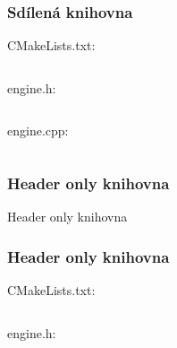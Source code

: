 \begin{frame}[fragile]
\frametitle{Sdílená knihovna}
CMakeLists.txt:
{\scriptsize\inputminted[frame=lines]{cmake}{../examples/06-SharedLibrary/CMakeLists.txt}}
engine.h:
{\scriptsize\inputminted[frame=lines]{c++}{../examples/06-SharedLibrary/engine.h}}
engine.cpp:
{\scriptsize\inputminted[frame=lines]{c++}{../examples/06-SharedLibrary/engine.cpp}}
\end{frame}

\begin{frame}
\frametitle{Header only knihovna}
\begin{center}
\Huge {\color{white}Header only knihovna}
\end{center}
\end{frame}

\begin{frame}[fragile]
\frametitle{Header only knihovna}
CMakeLists.txt:
{\scriptsize\inputminted[frame=lines]{cmake}{../examples/07-HeaderLibrary/CMakeLists.txt}}
engine.h:
{\scriptsize\inputminted[frame=lines]{c++}{../examples/07-HeaderLibrary/engine.h}}
\end{frame}

